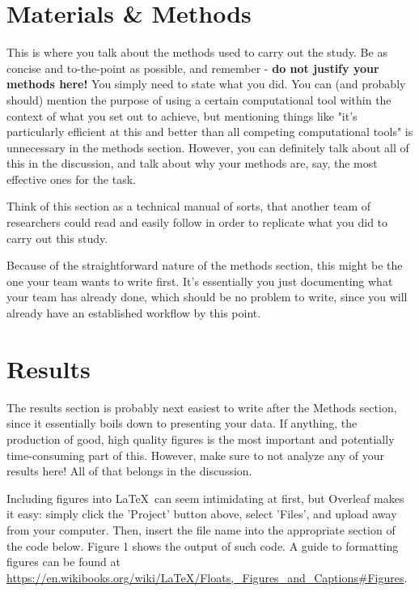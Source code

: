 \documentclass[10pt,twocolumn,letterpaper]{article}
\begin{document}
\section{Materials \& Methods}

This is where you talk about the methods used to carry out the study. Be as concise and to-the-point as possible, and remember - \textbf{do not justify your methods here!} You simply need to state what you did. You can (and probably should) mention the purpose of using a certain computational tool within the context of what you set out to achieve, but mentioning things like "it's particularly efficient at this and better than all competing computational tools" is unnecessary in the methods section. However, you can definitely talk about all of this in the discussion, and talk about why your methods are, say, the most effective ones for the task.

Think of this section as a technical manual of sorts, that another team of researchers could read and easily follow in order to replicate what you did to carry out this study.

Because of the straightforward nature of the methods section, this might be the one your team wants to write first. It's essentially you just documenting what your team has already done, which should be no problem to write, since you will already have an established workflow by this point.

\section{Results}

The results section is probably next easiest to write after the Methods section, since it essentially boils down to presenting your data. If anything, the production of good, high quality figures is the most important and potentially time-consuming part of this. However, make sure to not analyze any of your results here! All of that belongs in the discussion.

Including figures into \LaTeX\ can seem intimidating at first, but Overleaf makes it easy: simply click the 'Project' button above, select 'Files', and upload away from your computer. Then, insert the file name into the appropriate section of the code below.  Figure 1  shows the output of such code. A guide to formatting figures can be found at \url{https://en.wikibooks.org/wiki/LaTeX/Floats,_Figures_and_Captions#Figures}.\\
\end{document}
